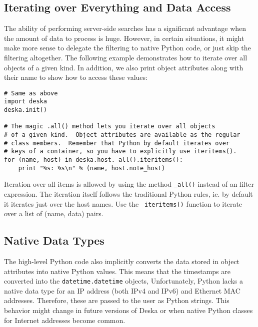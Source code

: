 \documentclass[deska]{subfiles}
\begin{document}
\subsection{Iterating over Everything and Data Access}

The ability of performing server-side searches has a significant advantage when the amount of data to process is huge.
However, in certain situations, it might make more sense to delegate the filtering to native Python code, or just skip
the filtering altogether.  The following example demonstrates how to iterate over all objects of a given kind.  In
addition, we also print object attributes along with their name to show how to access these values:

\begin{verbatim}
# Same as above
import deska
deska.init()

# The magic .all() method lets you iterate over all objects
# of a given kind.  Object attributes are available as the regular
# class members.  Remember that Python by default iterates over
# keys of a container, so you have to explicitly use iteritems().
for (name, host) in deska.host._all().iteritems():
    print "%s: %s\n" % (name, host.note_host)
\end{verbatim}

Iteration over all items is allowed by using the method {\tt \_all()} instead of an filter expression.  The iteration
itself follows the traditional Python rules, ie. by default it iterates just over the host names.  Use the {\tt
iteritems()} function to iterate over a list of (name, data) pairs.

\subsection{Native Data Types}

The high-level Python code also implicitly converts the data stored in object attributes into native Python values.
This means that the timestamps are converted into the {\tt datetime.datetime} objects,  Unfortunately, Python lacks a
native data type for an IP address (both IPv4 and IPv6) and Ethernet MAC addresses.  Therefore, these are passed to the
user as Python strings.  This behavior might change in future versions of Deska or when native Python classes for
Internet addresses become common.
\end{document}
